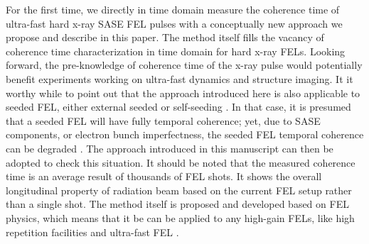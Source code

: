 \documentclass[%
 preprint,
 amsmath,amssymb,
 aps,
 prl,
 superscriptaddress,
 floatfix,
 letter,
]{revtex4-1}
\begin{document}
For the first time, we directly in time domain measure the coherence time of ultra-fast hard x-ray SASE FEL pulses with a conceptually new approach we propose and describe in this paper. The method itself fills the vacancy of coherence time characterization in time domain for hard x-ray FELs. Looking forward, the pre-knowledge of coherence time of the x-ray pulse would potentially benefit experiments working on ultra-fast dynamics and structure imaging. It it worthy while to point out that the approach introduced here is also applicable to seeded FEL, either external seeded \cite*{yuscience} or self-seeding \cite*{lclsselfseeding}. In that case, it is presumed that a seeded FEL will have fully temporal coherence; yet, due to SASE components, or electron bunch imperfectness, the seeded FEL temporal coherence can be degraded \cite*{interplay}. The approach introduced in this manuscript can then be adopted to check this situation. It should be noted that the measured coherence time is an average result of thousands of FEL shots. It shows the overall longitudinal property of radiation beam based on the current FEL setup rather than a single shot. The method itself is proposed and developed based on FEL physics, which means that it be can be applied to any high-gain FELs, like high repetition facilities\cite*{lclsii} and ultra-fast FEL \cite*{XLEAP}.
\end{document}
